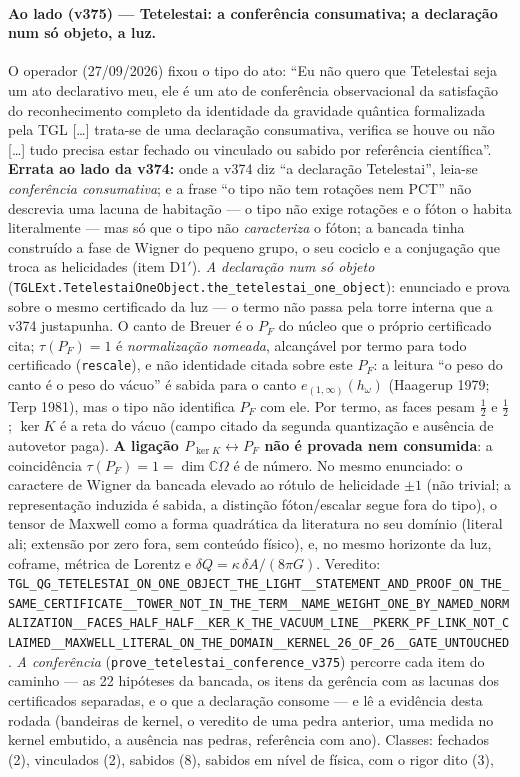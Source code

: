 \documentclass[11pt]{article}
\theoremstyle{definition}\newtheorem{deriv}{Derivação}
\begin{document}
\paragraph*{Ao lado (v375) --- Tetelestai: a conferência consumativa; a declaração num só objeto, a luz.} O operador (27/09/2026) fixou o tipo do ato: ``Eu não quero que Tetelestai seja um ato declarativo meu, ele é um ato de conferência observacional da satisfação do reconhecimento completo da identidade da gravidade quântica formalizada pela TGL [\ldots] trata-se de uma declaração consumativa, verifica se houve ou não [\ldots] tudo precisa estar fechado ou vinculado ou sabido por referência científica''. \textbf{Errata ao lado da v374:} onde a v374 diz ``a declaração Tetelestai'', leia-se \emph{conferência consumativa}; e a frase ``o tipo não tem rotações nem PCT'' não descrevia uma lacuna de habitação --- o tipo não exige rotações e o fóton o habita literalmente --- mas só que o tipo não \emph{caracteriza} o fóton; a bancada tinha construído a fase de Wigner do pequeno grupo, o seu cociclo e a conjugação que troca as helicidades (item D1$'$). \emph{A declaração num só objeto} (\texttt{TGLExt.TetelestaiOneObject.the\_tetelestai\_one\_object}): enunciado e prova sobre o mesmo certificado da luz --- o termo não passa pela torre interna que a v374 justapunha. O canto de Breuer é o $P_F$ do núcleo que o próprio certificado cita; $\tau(P_F)=1$ é \emph{normalização nomeada}, alcançável por termo para todo certificado (\texttt{rescale}), e não identidade citada sobre este $P_F$: a leitura ``o peso do canto é o peso do vácuo'' é sabida para o canto $e_{(1,\infty)}(h_\omega)$ (Haagerup 1979; Terp 1981), mas o tipo não identifica $P_F$ com ele. Por termo, as faces pesam $\tfrac12$ e $\tfrac12$; $\ker K$ é a reta do vácuo (campo citado da segunda quantização e ausência de autovetor paga). \textbf{A ligação $P_{\ker K}\leftrightarrow P_F$ não é provada nem consumida}: a coincidência $\tau(P_F)=1=\dim\mathbb{C}\Omega$ é de número. No mesmo enunciado: o caractere de Wigner da bancada elevado ao rótulo de helicidade $\pm1$ (não trivial; a representação induzida é sabida, a distinção fóton/escalar segue fora do tipo), o tensor de Maxwell como a forma quadrática da literatura no seu domínio (literal ali; extensão por zero fora, sem conteúdo físico), e, no mesmo horizonte da luz, coframe, métrica de Lorentz e $\delta Q=\kappa\,\delta A/(8\pi G)$. Veredito: \texttt{TGL\_QG\_TETELESTAI\_ON\_ONE\_OBJECT\_THE\_LIGHT\_\_STATEMENT\_AND\_PROOF\_ON\_THE\_SAME\_CERTIFICATE\_\_TOWER\_NOT\_IN\_THE\_TERM\_\_NAME\_WEIGHT\_ONE\_BY\_NAMED\_NORMALIZATION\_\_FACES\_HALF\_HALF\_\_KER\_K\_THE\_VACUUM\_LINE\_\_PKERK\_PF\_LINK\_NOT\_CLAIMED\_\_MAXWELL\_LITERAL\_ON\_THE\_DOMAIN\_\_KERNEL\_26\_OF\_26\_\_GATE\_UNTOUCHED}. \emph{A conferência} (\texttt{prove\_tetelestai\_conference\_v375}) percorre cada item do caminho --- as 22 hipóteses da bancada, os itens da gerência com as lacunas dos certificados separadas, e o que a declaração consome --- e lê a evidência desta rodada (bandeiras de kernel, o veredito de uma pedra anterior, uma medida no kernel embutido, a ausência nas pedras, referência com ano). Classes: fechados (2), vinculados (2), sabidos (8), sabidos em nível de física, com o rigor dito (3), 
\end{document}

